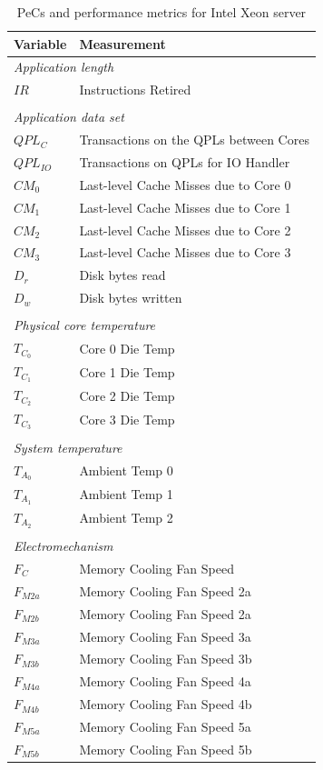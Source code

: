 \documentclass[times, 10pt,twocolumn]{IEEEtran}
\begin{document}
\begin{small}
\begin{table}[tbhp]
  \centering
  \caption{PeCs and performance metrics for Intel Xeon server}
  \label{tab:intelmodel}
  \begin{tabular}{l l}
\hline
\hline
\textbf{Variable}&\textbf{Measurement}\\
\hline
\multicolumn{2}{l}{\textit{Application length}}\\
$IR$&Instructions Retired \\
&\\
\multicolumn{2}{l}{\textit{Application data set}}\\
$QPL_{C}$&Transactions on the QPLs between Cores\\
$QPL_{IO}$&Transactions on QPLs for IO Handler\\
$CM_{0}$&Last-level Cache Misses due to Core 0\\
$CM_{1}$&Last-level Cache Misses due to Core 1\\
$CM_{2}$&Last-level Cache Misses due to Core 2\\
$CM_{3}$&Last-level Cache Misses due to Core 3\\
$D_{r}$&Disk bytes read\\
$D_{w}$&Disk bytes written\\
& \\
\multicolumn{2}{l}{\textit{Physical core temperature}}\\
$T_{C_{0}}$&Core 0 Die Temp\\
$T_{C_{1}}$&Core 1 Die Temp\\
$T_{C_{2}}$&Core 2 Die Temp\\
$T_{C_{3}}$&Core 3 Die Temp\\
& \\
\multicolumn{2}{l}{\textit{System temperature}}\\
$T_{A_{0}}$&Ambient Temp 0\\
$T_{A_{1}}$&Ambient Temp 1\\
$T_{A_{2}}$&Ambient Temp 2\\
& \\
\multicolumn{2}{l}{\textit{Electromechanism}}\\
$F_{C}$&Memory Cooling Fan Speed\\
$F_{M2a}$&Memory Cooling Fan Speed 2a\\
$F_{M2b}$&Memory Cooling Fan Speed 2a\\
$F_{M3a}$&Memory Cooling Fan Speed 3a\\
$F_{M3b}$&Memory Cooling Fan Speed 3b\\
$F_{M4a}$&Memory Cooling Fan Speed 4a\\
$F_{M4b}$&Memory Cooling Fan Speed 4b\\
$F_{M5a}$&Memory Cooling Fan Speed 5a\\
$F_{M5b}$&Memory Cooling Fan Speed 5b\\
\hline
  \end{tabular}
\end{table}
\end{small}
\end{document}
